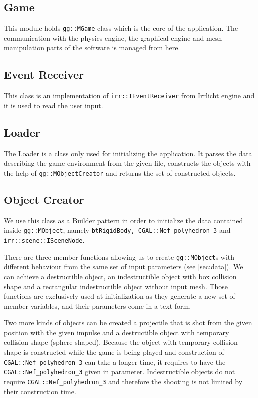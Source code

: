 \subsection*{Game}
This module holds {\tt gg::MGame} class which is the core of the application. The communication with the physics engine,  the graphical engine and mesh manipulation parts of the software is managed from here.

\subsection*{Event Receiver}
This class is an implementation of {\tt irr::IEventReceiver} from Irrlicht engine and it is used to read the user input.

\subsection*{Loader}
The Loader is a class only used for initializing the application. It parses the data describing the game environment from the given file, constructs the objects with the help of {\tt gg::MObjectCreator} and returns the set of constructed objects.

\subsection*{Object Creator}
We use this class as a Builder pattern in order to initialize the data contained inside {\tt gg::MObject}, namely {\tt btRigidBody, CGAL::Nef\_polyhedron\_3} and {\tt irr::scene::ISceneNode}.

There are three member functions allowing us to create {\tt gg::MObject}s  with different behaviour from the same set of input parameters (see \cref{sec:data}). We can achieve a destructible object, an indestructible object with box collision shape and a rectangular indestructible object without input mesh. Those functions are exclusively used at initialization as they generate a new set of member variables, and their parameters come in a text form.

Two more kinds of objects can be created a projectile that is shot from the given position with the given impulse and a destructible object with temporary collision shape (sphere shaped). Because the object with temporary collision shape is constructed while the game is being played and construction of {\tt CGAL::Nef\_polyhedron\_3} can take a longer time, it requires to have the {\tt CGAL::Nef\_polyhedron\_3} given in parameter. Indestructible objects do not require {\tt CGAL::Nef\_polyhedron\_3}  and therefore the shooting is not limited by their construction time.

